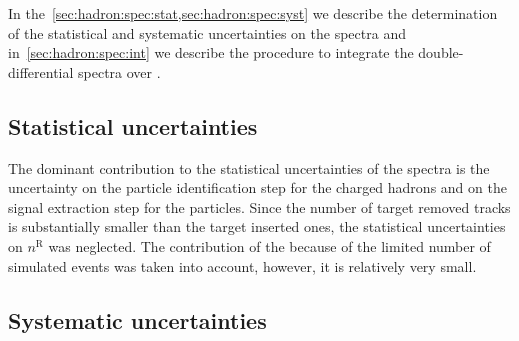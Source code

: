 In the~\cref{sec:hadron:spec:stat,sec:hadron:spec:syst}
we describe the determination of the
statistical and systematic uncertainties on the spectra
and in~\cref{sec:hadron:spec:int} we describe the procedure to
integrate the double-differential spectra over \pT.

\subsection{Statistical uncertainties}
\label{sec:hadron:spec:stat}

The dominant contribution to the statistical uncertainties
of the spectra is the uncertainty on the particle identification
step for the charged hadrons and on the signal extraction step
for the \vzero particles.
Since the number of target removed tracks is substantially
smaller than the target inserted ones,  
the statistical uncertainties on $n^\text{R}$ was neglected.
The contribution of the \cmc because of the limited number of
simulated events was taken into account, however, it
is relatively very small. 


\subsection{Systematic uncertainties}
\label{sec:hadron:spec:syst}

